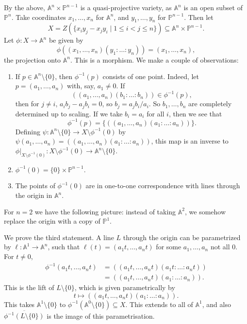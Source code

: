 \documentclass[12pt]{article}
\begin{document}
\begin{exbox}
	By the above, $\mathbb{A}^n \times \mathbb{P}^{n-1}$ is a quasi-projective variety, as $\mathbb{A}^n$ is an open subset of $\mathbb{P}^n$. Take coordinates $x_1, \ldots, x_n$ for $\mathbb{A}^n$, and $y_1, \ldots, y_n$ for $\mathbb{P}^{n-1}$. Then let
	\[
		X = Z (\{x_i y_j - x_j y_i \mid 1 \leq i < j \leq n\}) \subseteq \mathbb{A}^n \times \mathbb{P}^{n-1}.
	\]
	Let $\phi : X \to \mathbb{A}^n$ be given by
	\[
	\phi((x_1, \ldots, x_n)(y_1: \ldots: y_n)) = (x_1, \ldots, x_n),
	\]
	the projection onto $\mathbb{A}^n$. This is a morphism. We make a couple of observations:
	\begin{enumerate}
		\item If $p \in \mathbb{A}^n \setminus \{0\}$, then $\phi^{-1}(p)$ consists of one point. Indeed, let $p = (a_1, \ldots, a_n)$ with, say, $a_1 \neq 0$. If
			\[
				((a_1, \ldots, a_n)(b_1 : \ldots: b_n)) \in \phi^{-1}(p),
			\]
			then for $j \neq i$, $a_i b_j - a_j b_i = 0$, so $b_j = a_jb_i/a_i$. So $b_1, \ldots, b_n$ are completely determined up to scaling. If we take $b_i = a_i$ for all $i$, then we see that
			\[
				\phi^{-1}(p) = \{((a_1, \ldots, a_n)(a_1 : \ldots : a_n))\}.
			\]
			Defining $\psi : \mathbb{A}^n \setminus \{0\} \to X \setminus \phi^{-1}(0)$ by $\psi(a_1, \ldots, a_n) = ((a_1, \ldots, a_n)(a_1 : \ldots: a_n))$, this map is an inverse to $\phi|_{X \setminus \phi^{-1}(0)} : X \setminus \phi^{-1}(0) \to \mathbb{A}^n \setminus \{0\}$.
		\item $\phi^{-1}(0) = \{0\} \times \mathbb{P}^{n-1}$.
		\item The points of $\phi^{-1}(0)$ are in one-to-one correspondence with lines through the origin in $\mathbb{A}^n$.
	\end{enumerate}
	For $n = 2$ we have the following picture: instead of taking $\mathbb{A}^2$, we somehow replace the origin with a copy of $\mathbb{P}^1$.

	We prove the third statement. A line $L$ through the origin can be parametrized by $\ell : \mathbb{A}^1 \to \mathbb{A}^n$, such that $\ell(t) = (a_1 t, \ldots, a_n t)$ for some $a_1, \ldots, a_n$ not all $0$. For $t \neq 0$,
	\begin{align*}
		\phi^{-1}(a_1t, \ldots, a_nt) &= ((a_1 t, \ldots, a_nt)(a_1t:\ldots:a_nt))\\
					      &=((a_1t,\ldots,a_nt)(a_1:\ldots:a_n)).
	\end{align*}
	This is the lift of $L \setminus\{0\}$, which is given parametrically by
	\[
	t \mapsto ((a_1t,\ldots,a_nt)(a_1:\ldots:a_n)).
	\]
	This takes $\mathbb{A}^1\setminus\{0\}$ to $\phi^{-1}(\mathbb{A}^0\setminus\{0\})\subseteq X$. This extends to all of $\mathbb{A}^1$, and also $\overline{\phi^{-1}(L\setminus\{0\})}$ is the image of this parametrisation.


\end{exbox}
\end{document}
